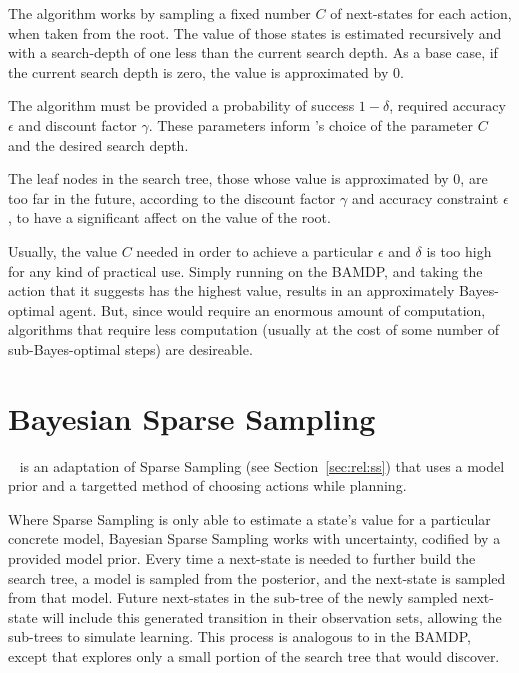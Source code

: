 The  algorithm works by sampling a fixed number $C$ of next-states for each action, when taken from the root. The value of those states is estimated recursively and with a search-depth of one less than the current search depth. As a base case, if the current search depth is zero, the value is approximated by $0$.

The algorithm must be provided a probability of success $1-\delta$, required accuracy $\epsilon$ and discount factor $\gamma$. These parameters inform 's choice of the parameter $C$ and the desired search depth.

The leaf nodes in the search tree, those whose value is approximated by $0$, are too far in the future, according to the discount factor $\gamma$ and accuracy constraint $\epsilon$, to have a significant affect on the value of the root.

Usually, the value $C$ needed in order to achieve a particular $\epsilon$ and $\delta$ is too high for any kind of practical use. Simply running  on the BAMDP, and taking the action that it suggests has the highest value, results in an approximately Bayes-optimal agent. But, since  would require an enormous amount of computation, algorithms that require less computation (usually at the cost of some number of sub-Bayes-optimal steps) are desireable.

\section{Bayesian Sparse Sampling}

~\cite{wang05} is an adaptation of Sparse Sampling (see Section~\ref{sec:rel:ss}) that uses a model prior and a targetted method of choosing actions while planning.

Where Sparse Sampling is only able to estimate a state's value for a particular concrete model, Bayesian Sparse Sampling works with uncertainty, codified by a provided model prior. Every time a next-state is needed to further build the search tree, a model is sampled from the posterior, and the next-state is sampled from that model. Future next-states in the sub-tree of the newly sampled next-state will include this generated transition in their observation sets, allowing the sub-trees to simulate learning. This process is analogous to  in the BAMDP, except that  explores only a small portion of the search tree that  would discover. 

